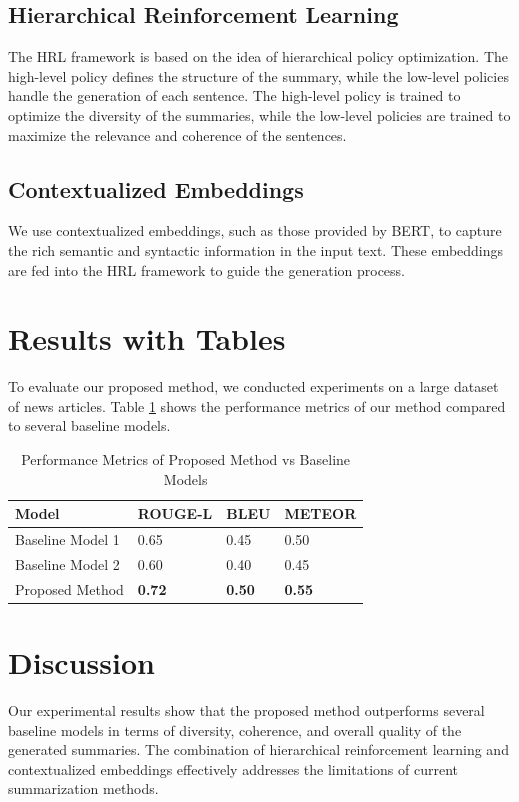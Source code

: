 \documentclass{article}
\begin{document}
\subsection{Hierarchical Reinforcement Learning}
The HRL framework is based on the idea of hierarchical policy optimization. The high-level policy defines the structure of the summary, while the low-level policies handle the generation of each sentence. The high-level policy is trained to optimize the diversity of the summaries, while the low-level policies are trained to maximize the relevance and coherence of the sentences.

\subsection{Contextualized Embeddings}
We use contextualized embeddings, such as those provided by BERT, to capture the rich semantic and syntactic information in the input text. These embeddings are fed into the HRL framework to guide the generation process.

\section{Results with Tables}
To evaluate our proposed method, we conducted experiments on a large dataset of news articles. Table \ref{tab:results} shows the performance metrics of our method compared to several baseline models.

\begin{table}[ht]
\centering
\caption{Performance Metrics of Proposed Method vs Baseline Models}
\label{tab:results}
\begin{tabular}{@{}llll@{}}
\toprule
Model & ROUGE-L & BLEU & METEOR \\
\midrule
Baseline Model 1 & 0.65 & 0.45 & 0.50 \\
Baseline Model 2 & 0.60 & 0.40 & 0.45 \\
Proposed Method & \textbf{0.72} & \textbf{0.50} & \textbf{0.55} \\
\bottomrule
\end{tabular}
\end{table}

\section{Discussion}
Our experimental results show that the proposed method outperforms several baseline models in terms of diversity, coherence, and overall quality of the generated summaries. The combination of hierarchical reinforcement learning and contextualized embeddings effectively addresses the limitations of current summarization methods.
\end{document}

